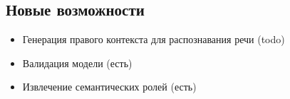 \documentclass[a4paper,12pt]{article}
\begin{document}
\subsection{Новые возможности}
\begin{itemize}
	\item Генерация правого контекста для распознавания речи (todo)
	\item Валидация модели  (есть)
	\item Извлечение семантических ролей  (есть)
\end{itemize}


\nocite{*}  %
 

\end{document}

